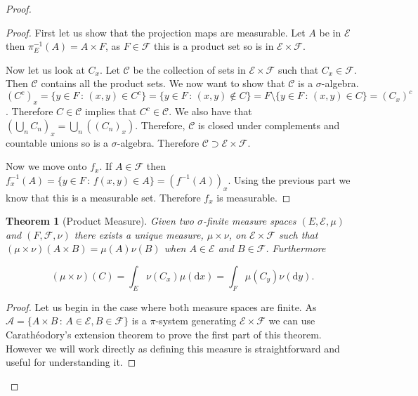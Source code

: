 \documentclass[
]{book}
\newtheorem{theorem}{Theorem}[chapter]
\theoremstyle{definition}
\theoremstyle{definition}
\theoremstyle{definition}
\theoremstyle{definition}
\theoremstyle{remark}
\begin{document}
\begin{proof}
\begin{proof}
First let us show that the projection maps are measurable. Let \(A\) be in \(\mathcal{E}\) then \(\pi_E^{-1}(A) = A \times F\), as \(F \in \mathcal{F}\) this is a product set so is in \(\mathcal{E} \times \mathcal{F}\).

Now let us look at \(C_x\). Let \(\mathcal{C}\) be the collection of sets in \(\mathcal{E} \times \mathcal{F}\) such that \(C_x \in \mathcal{F}\). Then \(\mathcal{C}\) contains all the product sets. We now want to show that \(\mathcal{C}\) is a \(\sigma\)-algebra. \((C^c)_x = \{ y \in F \,:\, (x,y) \in C^c\} = \{ y \in F \, :\, (x,y) \notin C\} = F \setminus \{ y \in F\,:\, (x,y) \in C\} = (C_x)^c\). Therefore \(C \in \mathcal{C}\) implies that \(C^c \in \mathcal{C}\). We also have that \(\left(\bigcup_n C_n \right)_x = \bigcup_n \left( (C_n)_x \right)\). Therefore, \(\mathcal{C}\) is closed under complements and countable unions so is a \(\sigma\)-algebra. Therefore \(\mathcal{C} \supset \mathcal{E} \times \mathcal{F}\).

Now we move onto \(f_x\). If \(A \in \mathcal{F}\) then \(f_x^{-1}(A) = \{ y \in F \,:\, f(x,y) \in A\} = (f^{-1}(A))_x\). Using the previous part we know that this is a measurable set. Therefore \(f_x\) is measurable.
\end{proof}

\begin{theorem}[Product Measure]
Given two \(\sigma\)-finite measure spaces \((E, \mathcal{E}, \mu)\) and \((F, \mathcal{F}, \nu)\) there exists a unique measure, \(\mu \times \nu\), on \(\mathcal{E} \times \mathcal{F}\) such that \((\mu \times \nu)(A \times B) = \mu(A)\nu(B)\) when \(A \in \mathcal{E}\) and \(B \in \mathcal{F}\). Furthermore

\[ (\mu \times \nu)(C) = \int_E \nu( C_x) \mu(\mathrm{d}x) = \int_F \mu(C_y) \nu(\mathrm{d}y).\]
\end{theorem}

\begin{proof}
Let us begin in the case where both measure spaces are finite.
As \(\mathcal{A} = \{ A \times B \,:\, A \in \mathcal{E}, B \in \mathcal{F}\}\) is a \(\pi\)-system generating \(\mathcal{E} \times \mathcal{F}\) we can use Carathéodory's extension theorem to prove the first part of this theorem. However we will work directly as defining this measure is straightforward and useful for understanding it.


\end{proof}
\end{proof}
\end{document}
